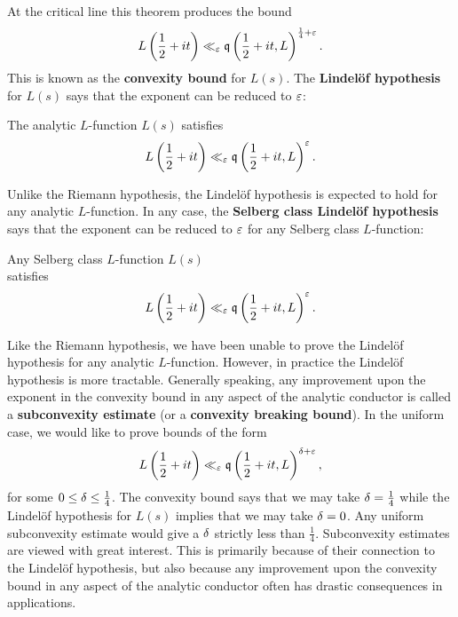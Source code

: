     At the critical line this theorem produces the bound
    \[
      L\left(\frac{1}{2}+it\right) \ll_{\varepsilon} \mathfrak{q}\left(\frac{1}{2}+it,L\right)^{\frac{1}{4}+\varepsilon}.
    \]
    This is known as the \textbf{convexity bound} for \(L(s)\). The \textbf{Lindel\"of hypothesis} for \(L(s)\) says that the exponent can be reduced to \(\varepsilon\):

    \begin{conjecture*}
      The analytic \(L\)-function \(L(s)\) satisfies
      \[
        L\left(\frac{1}{2}+it\right) \ll_{\varepsilon} \mathfrak{q}\left(\frac{1}{2}+it,L\right)^{\varepsilon}.
      \]
    \end{conjecture*}

    Unlike the Riemann hypothesis, the Lindel\"of hypothesis is expected to hold for any analytic \(L\)-function. In any case, the \textbf{Selberg class Lindel\"of hypothesis} says that the exponent can be reduced to \(\varepsilon\) for any Selberg class \(L\)-function:

    \begin{conjecture*}
      Any Selberg class \(L\)-function \(L(s)\) \\ satisfies
      \[
        L\left(\frac{1}{2}+it\right) \ll_{\varepsilon} \mathfrak{q}\left(\frac{1}{2}+it,L\right)^{\varepsilon}.
      \]
    \end{conjecture*}

    Like the Riemann hypothesis, we have been unable to prove the Lindel\"of hypothesis for any analytic \(L\)-function. However, in practice the Lindel\"of hypothesis is more tractable. Generally speaking, any improvement upon the exponent in the convexity bound in any aspect of the analytic conductor is called a \textbf{subconvexity estimate} (or a \textbf{convexity breaking bound}). In the uniform case, we would like to prove bounds of the form
    \[
      L\left(\frac{1}{2}+it\right) \ll_{\varepsilon} \mathfrak{q}\left(\frac{1}{2}+it,L\right)^{\delta+\varepsilon},
    \]
    for some \(0 \le \delta \le \frac{1}{4}\). The convexity bound says that we may take \(\delta = \frac{1}{4}\) while the Lindel\"of hypothesis for \(L(s)\) implies that we may take \(\delta = 0\). Any uniform subconvexity estimate would give a \(\delta\) strictly less than \(\frac{1}{4}\). Subconvexity estimates are viewed with great interest. This is primarily because of their connection to the Lindel\"of hypothesis, but also because any improvement upon the convexity bound in any aspect of the analytic conductor often has drastic consequences in applications.

